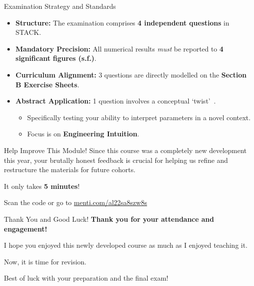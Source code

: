 {


\begin{frame}{Examination Strategy and Standards}
    \begin{itemize}
        \item \textbf{Structure:} The examination comprises \textbf{4 independent questions} in STACK.
        \item \textbf{Mandatory Precision:} All numerical results \textit{must} be reported to \textbf{4 significant figures (s.f.)}.
        \item \textbf{Curriculum Alignment:} 3 questions are directly modelled on the \textbf{Section B Exercise Sheets}.
        \item \textbf{Abstract Application:} 1 question involves a conceptual \lq twist\rq\ .
        \begin{itemize}
            \item Specifically testing your ability to interpret parameters in a novel context.
            \item Focus is on \textbf{Engineering Intuition}.
        \end{itemize}
    \end{itemize}
\end{frame}

\begin{frame}{Help Improve This Module!}
    \centering
    Since this course was a \alert{completely new development} this year, your brutally honest feedback is crucial for helping us refine and restructure the materials for future cohorts.

    \vspace{0.5cm}
    It only takes \textbf{5 minutes}!

    \vspace{1.0cm}
    \centering

    \vspace{0.5cm}
    Scan the code or go to \href{https://www.menti.com/al22sa8szw8s}{menti.com/al22sa8szw8s}
\end{frame}

\begin{frame}{Thank You and Good Luck!}
    \centering
    \vspace{1cm}
    \Large \textbf{Thank you for your attendance and engagement!}

    \vspace{0.5cm}
    \normalsize
    I hope you enjoyed this newly developed course as much as I enjoyed teaching it.

    \vspace{1cm}
    \Large \alert{Now, it is time for revision.}

    \vspace{0.5cm}
    \normalsize
    Best of luck with your preparation and the final exam!
\end{frame}
}